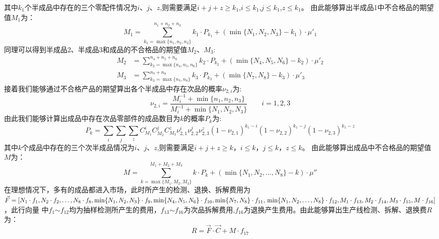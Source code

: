 \documentclass[withoutpreface,bwprint]{cumcmthesis} %
\begin{document}
		其中$k_{1}$个半成品中存在的三个零配件情况为$i$、$j$、$z$,则需要满足$i+j+z \ge k_{1}$,$i\le k_{1}$,$j\le k_{1}$,$z\le k_{1}$。
		由此能够算出半成品1中不合格品的期望值$M_{1}$为：
		\begin{equation}
			M_{1}=\sum_{k_{1}=\max \{n_{1},n_{2},n_{3}\}}^{n_{1}+n_{2}+n_{3}}k_{1}\cdot P_{k_{1}}+(\min \{N_{1},N_{2},N_{3}\}-k_{1})\cdot \mu'_{1}
			\label{eq:7}
		\end{equation}
		同理可以得到半成品2、半成品3和成品的不合格品的期望值$M_{2}$、$M_{3}$:
		\begin{align}
			M_{2} & =\sum_{k_{2}=\max \{n_{4},n_{5},n_{6}\}}^{n_{4}+n_{5}+n_{6}}k_{2}\cdot P_{k_{2}}+(\min \{N_{4},N_{5},N_{6}\}-k_{2})\cdot \mu'_{2} \\
			M_{3} & =\sum_{k_{3}=\max \{n_{7},n_{8}\}}^{n_{7}+n_{8}}k_{3}\cdot P_{k_{3}}+(\min \{N_{7},N_{8}\}-k_{3})\cdot \mu'_{3}
			\label{eq:8}
		\end{align}
		接着我们能够通过不合格产品的期望算出各个半成品中存在次品的概率$\nu_{2,i}$为:
$$\nu_{2,i}=\frac{M_{i}^{-1}+\min \{ n_{1},n_{2},n_{3}\}}{M_{i}^{-1}+\min \{N_{1},N_{2},N_{3}\}}\qquad i=1,2,3$$
由此我们能够计算出成品中存在次品零部件的成品数目为$k$的概率$P_{k}$为:
\begin{equation}
	P_{k}=\sum_{i}\sum_{j}\sum_{z}C_{M_{1}}^{i}C_{M_{2}}^{j}C_{M_{3}}^{z}\nu_{2,1}^{i}\nu_{2,2}^{j}\nu_{2,3}^{z}(1-\nu_{2,1})^{k_{1}-i}(1-\nu_{2,2})^{k_{1}-j}(1-\nu_{2,3})^{k_{1}-z}
	\label{eq:9}
\end{equation}
其中$k$个成品中存在的三个次半成品情况为$i$、$j$、$z$,则需要满足$i+j+z \ge k$，$i\le k$，$j\le k$，$z\le k$。
由此能够算出成品中不合格品的期望值$M$为：
\begin{equation}
	M=\sum_{k=\max \{M_{1},M_{2},M_{3}\}}^{M_{1}+M_{2}+M_{3}}k\cdot P_{k}+(\min \{N_{1},N_{2},\dots,N_{8}\}-k)\cdot \mu''
	\label{eq:10}
\end{equation}
在理想情况下，多有的成品都进入市场，此时所产生的检测、退换、拆解费用为$\vec{F}=[N_{1}\cdot f_{1},N_{2}\cdot f_{2},\dots,N_{8}\cdot f_{8},
	\min \{ N_{1},N_{2},N_{3}\}\cdot f_{9},\min \{ N_{4},N_{5},N_{6}\}\cdot f_{10},\min \{ N_{7},N_{8}\}\cdot f_{11},\\
	\min \{N_{1},N_{2},\dots,N_{8}\}\cdot f_{12},M_{1}\cdot f_{13},M_{2}\cdot f_{14},M_{3}\cdot f_{15},M\cdot f_{16}]$，此行向量
中$f_{1}$$\sim$$f_{12}$均为抽样检测所产生的费用，$f_{13}$$\sim$$f_{16}$为次品拆解费用,$f_{16}$为退换产生费用。由此能够算出生产线检测、拆解、退换费$R$为：
		\begin{equation}
			R=\vec{F}\cdot \vec{C} + M\cdot f_{17}
			\label{eq:11}
		\end{equation}
\end{document}
